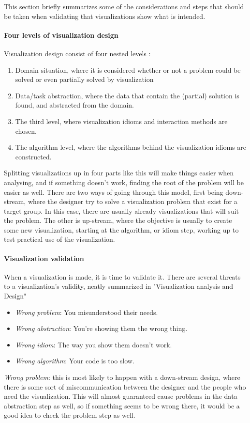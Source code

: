 \documentclass[Report.tex]{subfiles}
\begin{document}
	This section briefly summarizes some of the considerations and steps that should be taken when validating that visualizations show what is intended.
	\paragraph{Four levels of visualization design\\}
	Visualization design consist of four  nested levels \cite[68]{Tamara}:
	\begin{enumerate}
		\item Domain situation, where it is considered whether or not a problem could be solved or even partially solved by visualization
		\item Data/task abstraction, where the data that contain the (partial) solution is found, and abstracted from the domain.
		\item The third level, where visualization idioms and interaction methods are chosen.
		\item The algorithm level, where the algorithms behind the visualization idioms are constructed.
	\end{enumerate}
	Splitting visualizations up in four parts like this will make things easier when analysing, and if something doesn't work, finding the root of the problem will be easier as well.
	There are two ways of going through this model, first being down-stream, where the designer try to solve a visualization problem that exist for a target group. In this case, there are usually already visualizations that will suit the problem. The other is up-stream, where the objective is usually to create some new visualization, starting at the algorithm, or idiom step, working up to test practical use of the visualization.
	 
	\paragraph{Visualization validation\\}
	When a visualization is made, it is time to validate it. There are several threats to a visualization's validity, neatly summarized in "Visualization analysis and Design" \cite[75]{Tamara}
	\begin{itemize}
		\item \emph{Wrong problem}: You misunderstood their needs.
		\item \emph{Wrong abstraction}: You're showing them the wrong thing.
		\item \emph{Wrong idiom}: The way you show them doesn't work.
		\item \emph{Wrong algorithm}: Your code is too slow.
	\end{itemize}
	\emph{Wrong problem}: this is most likely to happen with a down-stream design, where there is some sort of miscommunication between the designer and the people who need the visualization. This will almost guaranteed cause problems in the data abstraction step as well, so if something seems to be wrong there, it would be a good idea to check the problem step as well.
	
\end{document}
